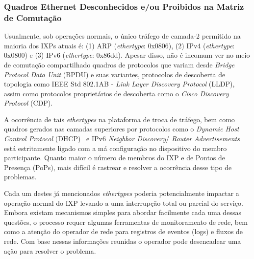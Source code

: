 \documentclass[12pt]{article}
\begin{document}
\subsubsection{Quadros Ethernet Desconhecidos e/ou Proibidos na Matriz de Comutação}
Usualmente, sob operações normais, o único tráfego de camada-2 permitido na maioria dos IXPs atuais é: (1) ARP (\textit{ethertype}: 0x0806), (2) IPv4 (\textit{ethertype}: 0x0800) e (3) IPv6 (\textit{ethertype}: 0x86dd). Apesar disso, não é incomum ver no meio de comutação compartilhado quadros de protocolos que variam desde \textit{Bridge Protocol Data Unit} (BPDU) e suas variantes, protocolos de descoberta de topologia como IEEE Std 802.1AB - \textit{Link Layer Discovery Protocol} (LLDP), assim como protocolos proprietários de descoberta como o \textit{Cisco Discovery Protocol} (CDP).


A ocorrência de tais \textit{ethertypes} na plataforma de troca de tráfego, bem como quadros gerados nas camadas superiores por protocolos como o \textit{Dynamic Host Control Protocol} (DHCP)~\cite{rfc2131} e IPv6 \textit{Neighbor Discovery}/ \textit{Router Advertisements}~\cite{rfc4861} está estritamente ligado com a má configuração no dispositivo do membro participante. Quanto maior o número de membros do IXP e de Pontos de Presença (PoPs), mais difícil é rastrear e resolver a ocorrência desse tipo de problemas.


Cada um destes já mencionados \textit{ethertypes} poderia potencialmente impactar a operação normal do IXP levando a uma interrupção total ou parcial do serviço. Embora existam mecanismos simples para abordar facilmente cada uma dessas questões, o processo requer algumas ferramentas de monitoramento de rede, bem como a atenção do operador de rede para registros de eventos (logs) e fluxos de rede. Com base nessas informações reunidas o operador pode desencadear uma ação para resolver o problema.
\end{document}
